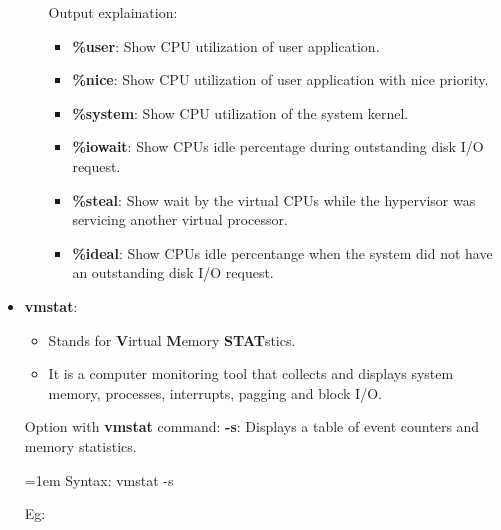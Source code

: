 \begin{flushleft}
\begin{itemize}
\begin{itemize}
		Output explaination:
		\begin{itemize}
			\item \textbf{\%user}: Show CPU utilization of user application.
			\item \textbf{\%nice}: Show CPU utilization of user application with nice priority.
			\item \textbf{\%system}: Show CPU utilization of the system kernel.
			\item \textbf{\%iowait}: Show CPUs idle percentage during outstanding disk I/O request.
			\item \textbf{\%steal}: Show wait by the virtual CPUs while the hypervisor was servicing another virtual processor.
			\item \textbf{\%ideal}: Show CPUs idle percentange when the	system did not have an outstanding disk I/O request.
		\end{itemize}
	\end{itemize}
	\newpage
	\item \textbf{vmstat}: 
	\begin{itemize}
		\item Stands for \textbf{V}irtual \textbf{M}emory \textbf{STAT}stics.
		\item It is a computer monitoring tool that collects and displays system memory, processes, interrupts, pagging and block I/O.
	\end{itemize}
	\bigskip
	Option with \textbf{vmstat} command:
	\newline
	\textbf{-s}: Displays a table of event counters and memory statistics.
	\newline
	\begin{tcolorbox}[breakable,notitle,boxrule=0pt,colback=pink,colframe=pink]
		\color{black}
		\font=1em
		Syntax: vmstat -s
		\font=4pt
	\end{tcolorbox}
	Eg:
	\begin{figure}[h!]
		\centering

\end{figure}
\end{itemize}
\end{flushleft}
